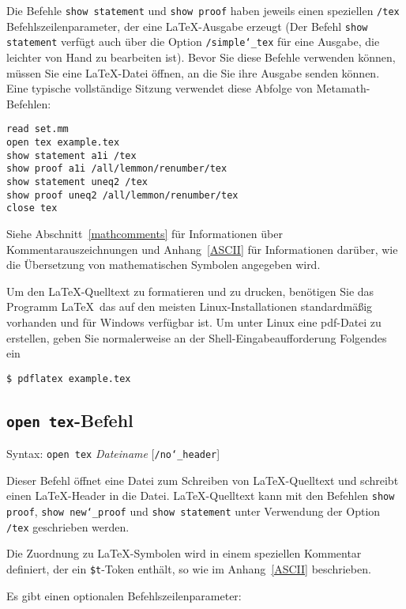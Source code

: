 Die Befehle \texttt{show statement} und \texttt{show proof} haben jeweils einen spe\-zi\-el\-len \texttt{/tex} Befehlszeilenparameter, der eine \LaTeX-Ausgabe erzeugt (Der Befehl \texttt{show statement} verfügt auch über die Option \texttt{/simple{\char`\_}tex} für eine Ausgabe, die leichter von Hand zu bearbeiten ist).  Bevor Sie diese Befehle verwenden können, müssen Sie eine \LaTeX-Datei öffnen, an die Sie ihre Ausgabe senden können.  Eine typische vollständige Sitzung verwendet diese Abfolge von Metamath-Befehlen: 

\begin{verbatim}
read set.mm
open tex example.tex
show statement a1i /tex
show proof a1i /all/lemmon/renumber/tex
show statement uneq2 /tex
show proof uneq2 /all/lemmon/renumber/tex
close tex
\end{verbatim}

Siehe Abschnitt~\ref{mathcomments} für Informationen über Kommentarauszeichnungen und Anhang~\ref{ASCII} für Informationen darüber, wie die Übersetzung von mathematischen Symbolen angegeben wird. 

Um den \LaTeX-Quelltext zu formatieren und zu drucken, benötigen Sie das Programm \LaTeX\, das auf den meisten Linux-Installationen standardmäßig vorhanden und für Windows verfügbar ist.  Um unter Linux eine pdf-Datei zu erstellen, geben Sie normalerweise an der Shell-Eingabeaufforderung Folgendes ein 
\begin{verbatim}
$ pdflatex example.tex
\end{verbatim}

\subsection{\texttt{open tex}-Befehl}

Syntax:  \texttt{open tex} {\em Dateiname} [\texttt{/no{\char`\_}header}]

Dieser Befehl öffnet eine Datei zum Schreiben von \LaTeX-Quelltext und schreibt einen \LaTeX-Header in die Datei. \LaTeX-Quelltext kann mit den Befehlen \texttt{show proof}, \texttt{show new{\char`\_}proof} und \texttt{show statement} unter Verwendung der Option \texttt{/tex} geschrieben werden. 

Die Zuordnung zu \LaTeX-Symbolen wird in einem speziellen Kommentar definiert, der ein \texttt{\$t}-Token enthält, so wie im Anhang~\ref{ASCII} beschrieben. 

Es gibt einen optionalen Befehlszeilenparameter:


